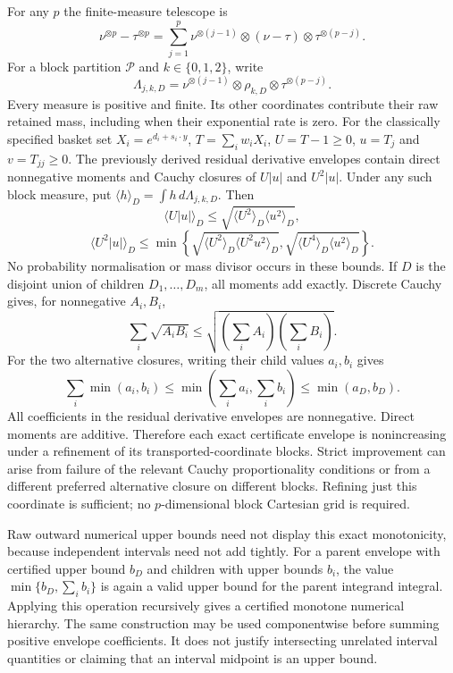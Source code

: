 For any $p$ the finite-measure telescope is
\[
 \nu^{\otimes p}-\tau^{\otimes p}
 =\sum_{j=1}^p\nu^{\otimes(j-1)}\otimes(\nu-\tau)
                \otimes\tau^{\otimes(p-j)}.
\]
For a block partition $\mathcal P$ and $k\in\{0,1,2\}$, write
\[
 \Lambda_{j,k,D}=\nu^{\otimes(j-1)}\otimes\rho_{k,D}
                            \otimes\tau^{\otimes(p-j)}.
\]
Every measure is positive and finite. Its other coordinates contribute
their raw retained mass, including when their exponential rate is zero.
For the classically specified basket set
$X_i=e^{d_i+s_i\cdot y}$,
$T=\sum_iw_iX_i$, $U=T-1\geq0$,
$u=T_j$ and $v=T_{jj}\geq0$.
The previously derived residual derivative envelopes contain direct
nonnegative moments and Cauchy closures of $U|u|$ and $U^2|u|$.
Under any such block measure, put $\langle h\rangle_D=\int h\,d\Lambda_{j,k,D}$.
Then
\[
 \langle U|u|\rangle_D\leq
 \sqrt{\langle U^2\rangle_D\langle u^2\rangle_D},
\]
\[
 \langle U^2|u|\rangle_D\leq\min\left\{
 \sqrt{\langle U^2\rangle_D\langle U^2u^2\rangle_D},
 \sqrt{\langle U^4\rangle_D\langle u^2\rangle_D}\right\}.
\]
No probability normalisation or mass divisor occurs in these bounds.
If $D$ is the disjoint union of children $D_1,\ldots,D_m$, all
moments add exactly. Discrete Cauchy gives, for nonnegative $A_i,B_i$,
\[
 \sum_i\sqrt{A_iB_i}\leq
 \sqrt{\left(\sum_iA_i\right)\left(\sum_iB_i\right)}.
\]
For the two alternative closures, writing their child values $a_i,b_i$
gives
\[
 \sum_i\min(a_i,b_i)\leq
 \min\left(\sum_i a_i,\sum_i b_i\right)
 \leq\min(a_D,b_D).
\]
All coefficients in the residual derivative envelopes are nonnegative.
Direct moments are additive. Therefore each exact certificate envelope
is nonincreasing under a refinement of its transported-coordinate
blocks. Strict improvement can arise from failure of the relevant
Cauchy proportionality conditions or from a different preferred
alternative closure on different blocks.
Refining just this coordinate is sufficient; no $p$-dimensional block
Cartesian grid is required.

Raw outward numerical upper bounds need not display this exact
monotonicity, because independent intervals need not add tightly. For a
parent envelope with certified upper bound $b_D$ and children with
upper bounds $b_i$, the value
$\min\{b_D,\sum_i b_i\}$ is again a valid upper bound for the
parent integrand integral. Applying this operation recursively gives a
certified monotone numerical hierarchy. The same construction may be
used componentwise before summing positive envelope coefficients.
It does not justify intersecting unrelated interval quantities or
claiming that an interval midpoint is an upper bound.

